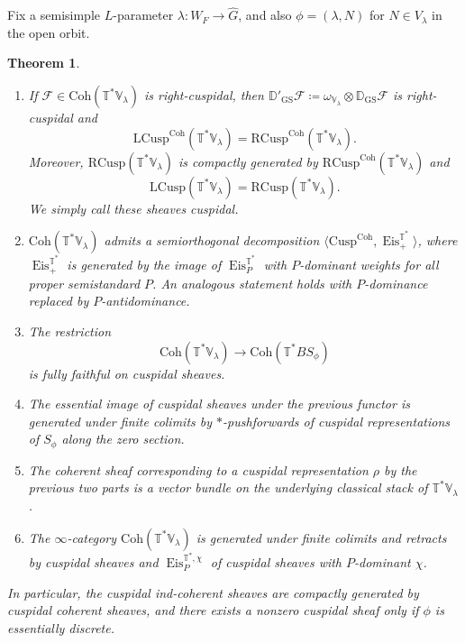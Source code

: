 \documentclass{amsart}
\newtheorem{theorem}{Theorem}[subsection]
\theoremstyle{definition}
\theoremstyle{remark}
\numberwithin{equation}{section}
\newcommand{\mc}{\mathcal}
\newcommand{\wh}{\widehat}
\newcommand{\D}{\mathbb{D}}
\DeclareMathOperator{\Eis}{\mathrm{Eis}}
\newcommand{\Coh}{\mathrm{Coh}}
\newcommand{\Cusp}{\mathrm{Cusp}}
\newcommand{\LCusp}{\mathrm{LCusp}}
\newcommand{\RCusp}{\mathrm{RCusp}}
\newcommand{\GS}{\mathrm{GS}}
\newcommand{\V}{\mathbb{V}}
\newcommand{\T}{\mathbb{T}}
\begin{document}
Fix a semisimple $L$-parameter $\lambda \colon W_F\to \wh G$, and also $\phi=(\lambda, N)$ for $N\in V_\lambda$ in the open orbit. 

\begin{theorem}\label{thm: ClassificationCuspidalCotangent}
\begin{enumerate}
    \item If $\mc F\in \Coh(\T^* \V_\lambda)$ is right-cuspidal, then $\D'_{\GS}\mc F\coloneq\omega_{\V_\lambda}\otimes\D_{\GS}\mc F$ is right-cuspidal and
    \begin{equation*}
            \LCusp^{\Coh}(\T^*\V_\lambda)=\RCusp^{\Coh}(\T^*\V_\lambda). 
    \end{equation*}
    Moreover, $\RCusp(\T^{\ast}\V_{\lambda})$ is compactly generated by $\RCusp^{\Coh}(\T^{\ast}\V_{\lambda})$ and
    \[
    \LCusp(\T^*\V_\lambda)=\RCusp(\T^*\V_\lambda). 
    \]
    We simply call these sheaves cuspidal. 
    \item[(1)'] $\Coh(\T^*\V_\lambda)$ admits a semiorthogonal decomposition $\langle \Cusp^{\Coh}, \Eis^{\T^{\ast}}_+ \rangle$, where $\Eis^{\T^{\ast}}_+$ is generated by  the image of $\Eis^{\T^{\ast}}_P$ with $P$-dominant weights for all proper semistandard $P$. An analogous statement holds with $P$-dominance replaced by $P$-antidominance. 
    \item The restriction
\[
\Coh(\T^* \V_\lambda) \to \Coh(\T^* BS_\phi)
\]
is fully faithful on cuspidal sheaves. 
    \item The essential image of cuspidal sheaves under the previous functor is generated under finite colimits by $*$-pushforwards of cuspidal representations of $S_\phi$ along the zero section. 
    \item The coherent sheaf corresponding to a cuspidal representation $\rho$ by the previous two parts is a vector bundle on the underlying classical stack of $\T^* \V_\lambda$. 
    \item The $\infty$-category $\Coh(\T^* \V_\lambda)$ is generated under finite colimits and retracts by cuspidal sheaves and $\Eis^{\T^*,\chi}_P$ of cuspidal sheaves with $P$-dominant $\chi$.
\end{enumerate}
In particular, the cuspidal ind-coherent sheaves are compactly generated by cuspidal coherent sheaves, and there exists a nonzero cuspidal sheaf only if $\phi$ is essentially discrete. 
\end{theorem}
\end{document}
